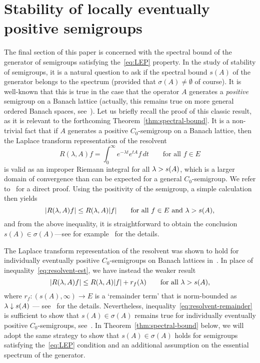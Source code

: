 \documentclass[sn-mathphys]{sn-jnl}%
\theoremstyle{thmstyleone}
\theoremstyle{thmstylethree}
\let\Re\relax
\DeclareMathOperator{\Re}{Re}
\begin{document}
\section{Stability of locally eventually positive semigroups}\label{sec:4}

The final section of this paper is concerned with the spectral bound of the generator of semigroups satisfying the~\eqref{eq:LEP} property. In the study of stability of semigroups, it is a natural question to ask if the spectral bound $s(A)$ of the generator belongs to the spectrum (provided that $\sigma(A)\ne\emptyset$ of course). It is well-known that this is true in the case that the operator $A$ generates a \emph{positive} semigroup on a Banach lattice (actually, this remains true on more general ordered Banach spaces, see~\cite[Theorem 5.3.1]{ABHN}). Let us briefly recall the proof of this classic result, as it is relevant to the forthcoming Theorem~\ref{thm:spectral-bound}. It is a non-trivial fact that if $A$ generates a positive $C_0$-semigroup on a Banach lattice, then the Laplace transform representation of the resolvent
\begin{equation*}
	R(\lambda,A)f = \int_0^\infty e^{-\lambda t}e^{tA}f \,dt \qquad\text{for all }f\in E
\end{equation*}
is valid as an improper Riemann integral for all $\Re\lambda >s(A)$, which is a larger domain of convergence than can be expected for a general $C_0$-semigroup. We refer to~\cite[Theorem 12.7]{BFR} for a direct proof. Using the positivity of the semigroup, a simple calculation then yields
\begin{equation}
	\label{eq:resolvent-est}
	\lvert R(\lambda,A)f\rvert \le R(\Re\lambda,A)\lvert f\rvert \qquad\text{for all }f\in E\text{ and }\Re\lambda >s(A),
\end{equation}
and from the above inequality, it is straightforward to obtain the conclusion $s(A)\in\sigma(A)$---see for example~\cite[Corollary 12.9]{BFR} for the details.

The Laplace transform representation of the resolvent was shown to hold for individually eventually positive $C_0$-semigroups on Banach lattices in~\cite[Proposition 7.1]{DGK1}. In place of inequality~\eqref{eq:resolvent-est}, we have instead the weaker result
\begin{equation}
	\label{eq:resolvent-remainder}
	\lvert R(\lambda,A)f\rvert \le R(\Re\lambda,A)\lvert f\rvert + r_f(\Re\lambda) \qquad\text{for all }\Re\lambda >s(A),
\end{equation}
where $r_f : (s(A),\infty) \to E$ is a `remainder term' that is norm-bounded as $\Re\lambda\downarrow s(A)$ --- see~\cite[Lemma 7.4]{DGK1} for the details. Nevertheless, inequality~\eqref{eq:resolvent-remainder} is sufficient to show that $s(A)\in\sigma(A)$ remains true for individually eventually positive $C_0$-semigroups, see~\cite[Theorem 7.6]{DGK1}. In Theorem~\ref{thm:spectral-bound} below, we will adopt the same strategy to show that $s(A)\in\sigma(A)$ holds for semigroups satisfying the~\eqref{eq:LEP} condition and an additional assumption on the essential spectrum of the generator.
\end{document}
